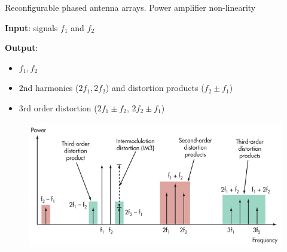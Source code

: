 \documentclass[../main.tex]{subfiles}
\begin{document}
\begin{frame}[t]{Reconfigurable phased antenna arrays. Power amplifier non-linearity}

\textbf{Input}: signals $f_1$ and $f_2$

\textbf{Output}: 
\begin{itemize}
    \item $f_1, f_2$
    \item $2$nd harmonics ($2f_1, 2f_2$) and distortion products ($f_2 \pm f_1$)
    \item $3$rd order distortion ($2f_1 \pm f_2$, $2f_2 \pm f_1$)
\end{itemize}

\begin{figure}[H]
\begin{adjustbox}{width=0.65\linewidth}
\includegraphics{pics/IMD.jpg}
\end{adjustbox}
\end{figure}


\end{frame}


%
%
\end{document}
